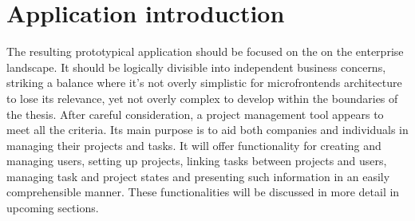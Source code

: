 \section{Application introduction}
The resulting prototypical application should be focused on the on the enterprise landscape. It should be logically divisible into independent business concerns, striking a balance where it's not overly simplistic for microfrontends architecture to lose its relevance, yet not overly complex to develop within the boundaries of the thesis. After careful consideration, a project management tool appears to meet all the criteria. Its main purpose is to aid both companies and individuals in managing their projects and tasks. It will offer functionality for creating and managing users, setting up projects, linking tasks between projects and users, managing task and project states and presenting such information in an easily comprehensible manner. These functionalities will be discussed in more detail in upcoming sections.